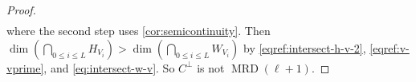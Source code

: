 \documentclass[11pt]{article}
\theoremstyle{plain}
\theoremstyle{definition}
\theoremstyle{remark}
\newcommand{\F}{\mathbb{F}}
\newcommand{\bv}{\bm{v}}
\newcommand{\by}{\bm{y}}
\newcommand{\bx}{\bm{x}}
\begin{document}
\begin{proof}
\begin{equation}
\begin{aligned}
\end{aligned}
\end{equation}
where the second step uses \cref{cor:semicontinuity}.
Then
$\dim \left(\bigcap_{0\leq i\leq L}H_{V_{i}}\right)>\dim\left(\bigcap_{0\leq i\leq L}W_{V_{i}}\right)$ by \eqref{eqref:intersect-h-v-2}, \eqref{eqref:v-vprime}, and \eqref{eq:intersect-w-v}.
So $C^{\perp}$ is not $\operatorname{MRD}(\ell+1)$. 
\end{proof}
\end{document}
